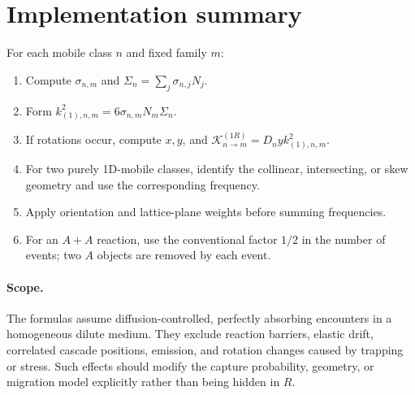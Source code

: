\documentclass[11pt]{article}
\newcommand{\KK}{\mathcal{K}}
\begin{document}
\section{Implementation summary}
For each mobile class \(n\) and fixed family \(m\):
\begin{enumerate}
 \item Compute \(\sigma_{n,m}\) and
 \(\Sigma_n=\sum_j\sigma_{n,j}N_j\).
 \item Form \(k^2_{(1),n,m}=6\sigma_{n,m}N_m\Sigma_n\).
 \item If rotations occur, compute \(x,y\), and
 \(\KK^{(1R)}_{n\to m}=D_nyk^2_{(1),n,m}\).
 \item For two purely 1D-mobile classes, identify the collinear, intersecting,
 or skew geometry and use the corresponding frequency.
 \item Apply orientation and lattice-plane weights before summing frequencies.
 \item For an \(A+A\) reaction, use the conventional factor \(1/2\) in the
 number of events; two \(A\) objects are removed by each event.
\end{enumerate}

\paragraph{Scope.}
The formulas assume diffusion-controlled, perfectly absorbing encounters in a
homogeneous dilute medium. They exclude reaction barriers, elastic drift,
correlated cascade positions, emission, and rotation changes caused by
trapping or stress. Such effects should modify the capture probability,
geometry, or migration model explicitly rather than being hidden in \(R\).



\end{document}
